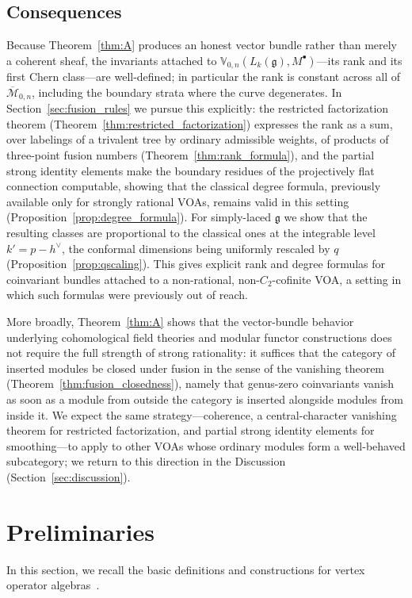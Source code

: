 \documentclass[12pt,a4paper,reqno]{amsart}
\numberwithin{equation}{section}
\theoremstyle{definition}
\newcommand{\g}{\mathfrak{g}}
\newcommand{\M}{\mathcal{M}}
\def\VV{\mathbb{V}}
\begin{document}
\subsection{Consequences}

Because Theorem~\ref{thm:A} produces an honest vector bundle rather than merely a coherent sheaf, the invariants attached to $\VV_{0,n}(L_k(\g),M^\bullet)$---its rank and its first Chern class---are well-defined; in particular the rank is constant across all of $\overline{\M}_{0,n}$, including the boundary strata where the curve degenerates. In Section~\ref{sec:fusion_rules} we pursue this explicitly: the restricted factorization theorem (Theorem~\ref{thm:restricted_factorization}) expresses the rank as a sum, over labelings of a trivalent tree by ordinary admissible weights, of products of three-point fusion numbers (Theorem~\ref{thm:rank_formula}), and the partial strong identity elements make the boundary residues of the projectively flat connection computable, showing that the classical degree formula, previously available only for strongly rational VOAs, remains valid in this setting (Proposition~\ref{prop:degree_formula}). For simply-laced $\g$ we show that the resulting classes are proportional to the classical ones at the integrable level $k'=p-h^\vee$, the conformal dimensions being uniformly rescaled by $q$ (Proposition~\ref{prop:qscaling}). This gives explicit rank and degree formulas for coinvariant bundles attached to a non-rational, non-$C_2$-cofinite VOA, a setting in which such formulas were previously out of reach.

More broadly, Theorem~\ref{thm:A} shows that the vector-bundle behavior underlying cohomological field theories and modular functor constructions does not require the full strength of strong rationality: it suffices that the category of inserted modules be closed under fusion in the sense of the vanishing theorem (Theorem~\ref{thm:fusion_closedness}), namely that genus-zero coinvariants vanish as soon as a module from outside the category is inserted alongside modules from inside it. We expect the same strategy---coherence, a central-character vanishing theorem for restricted factorization, and partial strong identity elements for smoothing---to apply to other VOAs whose ordinary modules form a well-behaved subcategory; we return to this direction in the Discussion (Section~\ref{sec:discussion}).

\tableofcontents

\section{Preliminaries}\label{sec:prelim}
In this section, we recall the basic definitions and constructions for vertex operator algebras~\cite[Sections 3 and 4]{LL04}.
\end{document}
